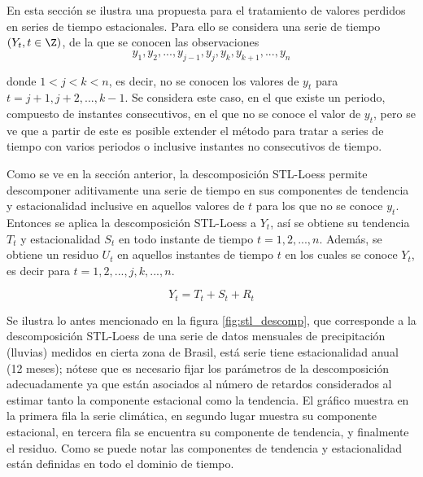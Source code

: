 \documentclass[12pt,oneside]{book}\usepackage[]{graphicx}\usepackage[]{color}
\theoremstyle{definition} %
\begin{document}
En esta sección se ilustra una propuesta para el tratamiento de valores perdidos en series de tiempo estacionales. Para ello se considera una serie de tiempo $(Y_t,t\in \Z)$, de la que se conocen las observaciones 
$$y_1,y_2,...,y_{j-1}, y_j, y_k, y_{k+1},...,y_n$$

donde $1 < j < k < n$, es decir, no se conocen los valores de $y_t$ para $t=j+1, j+2, ..., k-1$. Se considera este caso, en el que existe un periodo, compuesto de instantes consecutivos, en el que no se conoce el valor de $y_t$, pero se ve que a partir de este es posible extender el método para tratar a series de tiempo con varios periodos o inclusive instantes no consecutivos de tiempo.

Como se ve en la sección anterior, la descomposición STL-Loess permite descomponer aditivamente una serie de tiempo en sus componentes de tendencia y estacionalidad inclusive en aquellos valores de $t$ para los que no se conoce $y_t$. Entonces se aplica la descomposición STL-Loess a $Y_t$, así se obtiene su tendencia $T_t$ y estacionalidad $S_t$ en todo instante de tiempo $t=1,2,...,n$. Además, se obtiene un residuo $U_t$ en aquellos instantes de tiempo $t$ en los cuales se conoce $Y_t$, es decir para $t=1,2,...,j,k,...,n$.


\begin{equation}
\label{eq:stl_descomp}
Y_t = T_t + S_t + R_t
\end{equation}

Se ilustra lo antes mencionado en la figura \ref{fig:stl_descomp}, que corresponde a la descomposición STL-Loess de una serie de datos mensuales de precipitación (lluvias) medidos en cierta zona de Brasil, está serie tiene estacionalidad anual (12 meses); nótese que es necesario fijar los parámetros de la descomposición adecuadamente ya que están asociados al número de retardos considerados al estimar tanto la componente estacional como la tendencia. El gráfico muestra en la primera fila la serie climática, en segundo lugar muestra su componente estacional, en tercera fila se encuentra su componente de tendencia, y finalmente el residuo. Como se puede notar las componentes de tendencia y estacionalidad están definidas en todo el dominio de tiempo.
\end{document}
